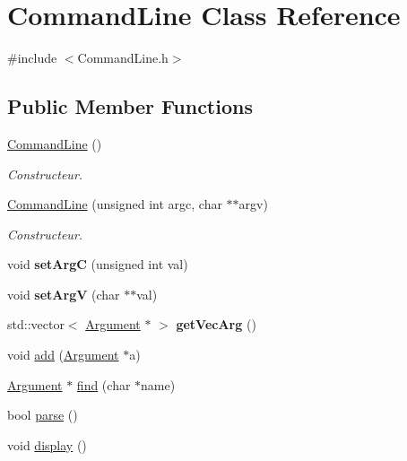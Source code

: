 \hypertarget{classCommandLine}{\section{Command\-Line Class Reference}
\label{classCommandLine}
}


{\ttfamily \#include $<$Command\-Line.\-h$>$}

\subsection*{Public Member Functions}
\begin{DoxyCompactItemize}
\item 
\hyperlink{classCommandLine_ae6329212e2108a9e2a1795f27fab33eb}{Command\-Line} ()
\begin{DoxyCompactList}\small\item\em Constructeur. \end{DoxyCompactList}\item 
\hyperlink{classCommandLine_ab996878223010dc05cac5e21606e0671}{Command\-Line} (unsigned int argc, char $\ast$$\ast$argv)
\begin{DoxyCompactList}\small\item\em Constructeur. \end{DoxyCompactList}\item 
\hypertarget{classCommandLine_a8d677ccd88e53ba3e1c01936a39d231d}{void {\bfseries set\-Arg\-C} (unsigned int val)}\label{classCommandLine_a8d677ccd88e53ba3e1c01936a39d231d}

\item 
\hypertarget{classCommandLine_a3e5dc0a46e7faa50564b3df18f6456bb}{void {\bfseries set\-Arg\-V} (char $\ast$$\ast$val)}\label{classCommandLine_a3e5dc0a46e7faa50564b3df18f6456bb}

\item 
\hypertarget{classCommandLine_a392affafb13a71b1ec6c731e37f65954}{std\-::vector$<$ \hyperlink{classArgument}{Argument} $\ast$ $>$ {\bfseries get\-Vec\-Arg} ()}\label{classCommandLine_a392affafb13a71b1ec6c731e37f65954}

\item 
void \hyperlink{classCommandLine_a3cd1954c5c82980a3f57288d09192937}{add} (\hyperlink{classArgument}{Argument} $\ast$a)
\item 
\hyperlink{classArgument}{Argument} $\ast$ \hyperlink{classCommandLine_a884050a7939bd56a166001f162fbfc7b}{find} (char $\ast$name)
\item 
bool \hyperlink{classCommandLine_a62cd80cf6f4f99867034ce43c2c1b94f}{parse} ()
\item 
\hypertarget{classCommandLine_a611e230a49e8fccc31410aad81c88991}{void \hyperlink{classCommandLine_a611e230a49e8fccc31410aad81c88991}{display} ()}\label{classCommandLine_a611e230a49e8fccc31410aad81c88991}


\end{DoxyCompactItemize}
